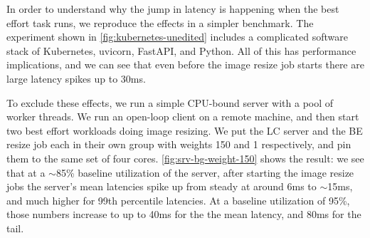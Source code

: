 In order to understand why the jump in latency is happening when the best effort
task runs, we reproduce the effects in a simpler benchmark. The experiment shown
in \autoref{fig:kubernetes-unedited} includes a complicated software stack of
Kubernetes, uvicorn, FastAPI, and Python. All of this has performance
implications, and we can see that even before the image resize job starts there
are large latency spikes up to 30ms.

To exclude these effects, we run a simple CPU-bound server with a pool of worker
threads. We run an open-loop client on a remote machine, and then start two best
effort workloads doing image resizing. We put the LC server and the BE resize
job each in their own \cgroups{} group with weights 150 and 1 respectively, and
pin them to the same set of four cores. \autoref{fig:srv-bg-weight-150} shows
the result: we see that at a $\sim$85\% baseline utilization of the server,
after starting the image resize jobs the server's mean latencies spike up from
steady at around 6ms to $\sim$15ms, and much higher for 99th percentile
latencies. At a baseline utilization of 95\%, those numbers increase to up to
40ms for the the mean latency, and 80ms for the tail.

